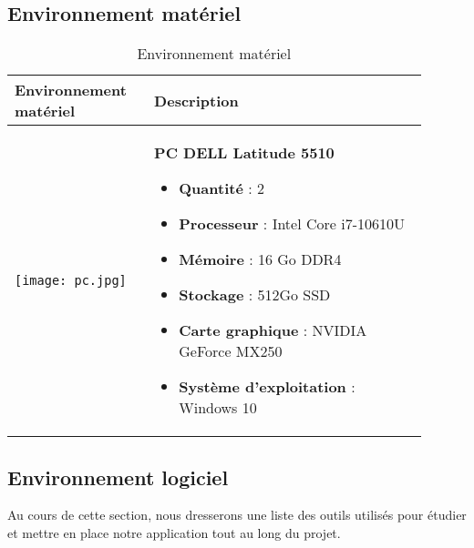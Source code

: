 \subsection{Environnement matériel}

\begin{table}[H]
  \centering
  \begin{center}
    \begin{tabular}{|p{0.3\linewidth}|p{0.6\linewidth}|}
      \hline
      Environnement matériel & Description \\
      \hline
      \begin{minipage}{\linewidth}
        \texttt{[image: pc.jpg]}
      \end{minipage} &
      \begin{minipage}{\linewidth}
        \vspace{0.2cm}
        \textbf{PC DELL Latitude 5510}
        \begin{itemize}
          \item \textbf{Quantité} : 2
          \item \textbf{Processeur} : Intel Core i7-10610U 
          \item \textbf{Mémoire} : 16 Go DDR4 
          \item \textbf{Stockage} : 512Go SSD 
          \item \textbf{Carte graphique} : NVIDIA GeForce MX250 
          \item \textbf{Système d'exploitation} : Windows 10 
        \end{itemize}
        \vspace{0.2cm}
      \end{minipage} \\
      \hline
    \end{tabular}

  \caption{Environnement matériel}
  \label{tab:environnement_materiel}
  \end{center}
\end{table}

\subsection{Environnement logiciel}
Au cours de cette section, nous dresserons une liste des outils utilisés pour étudier et mettre en place notre application tout au long du projet.

